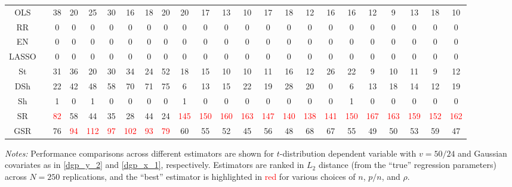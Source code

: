 \begin{table}
{\begin{tabular*}{\textwidth}{@{\extracolsep{\fill}}cc|ccccccc|ccccccc|ccccccc@{}}
\hline
OLS &  & 38 & 20 & 25 & 30 & 16 & 18 & 20 & 20 & 17 & 13 & 10 & 17 & 18 & 12 & 16 & 16 & 12 & 9 & 13 & 18 & 10 \\
RR &  & 0 & 0 & 0 & 0 & 0 & 0 & 0 & 0 & 0 & 0 & 0 & 0 & 0 & 0 & 0 & 0 & 0 & 0 & 0 & 0 & 0 \\
EN &  & 0 & 0 & 0 & 0 & 0 & 0 & 0 & 0 & 0 & 0 & 0 & 0 & 0 & 0 & 0 & 0 & 0 & 0 & 0 & 0 & 0 \\
LASSO &  & 0 & 0 & 0 & 0 & 0 & 0 & 0 & 0 & 0 & 0 & 0 & 0 & 0 & 0 & 0 & 0 & 0 & 0 & 0 & 0 & 0 \\
St &  & 31 & 36 & 20 & 30 & 34 & 24 & 52 & 18 & 15 & 10 & 10 & 11 & 16 & 12 & 26 & 22 & 9 & 10 & 11 & 9 & 12 \\
DSh &  & 22 & 42 & 48 & 58 & 70 & 71 & 75 & 6 & 13 & 15 & 22 & 19 & 28 & 20 & 0 & 6 & 13 & 18 & 14 & 12 & 19 \\
Sh &  & 1 & 0 & 1 & 0 & 0 & 0 & 0 & 1 & 0 & 0 & 0 & 0 & 0 & 0 & 0 & 1 & 0 & 0 & 0 & 0 & 0 \\
SR &  & \textcolor{red}{82} & 58 & 44 & 35 & 28 & 44 & 24 & \textcolor{red}{145} & \textcolor{red}{150} & \textcolor{red}{160} & \textcolor{red}{163} & \textcolor{red}{147} & \textcolor{red}{140} & \textcolor{red}{138} & \textcolor{red}{141} & \textcolor{red}{150} & \textcolor{red}{167} & \textcolor{red}{163} & \textcolor{red}{159} & \textcolor{red}{152} & \textcolor{red}{162} \\
GSR &  & 76 & \textcolor{red}{94} & \textcolor{red}{112} & \textcolor{red}{97} & \textcolor{red}{102} & \textcolor{red}{93} & \textcolor{red}{79} & 60 & 55 & 52 & 45 & 56 & 48 & 68 & 67 & 55 & 49 & 50 & 53 & 59 & 47 \\
\hline
\end{tabular*}%
}
\begin{tablenotes}[flushleft]
\footnotesize
\item \emph{Notes:} Performance comparisons across different estimators are shown for $t$-distribution dependent variable with $v=50/24$ and Gaussian covariates as in \eqref{dgp_y_2} and \eqref{dgp_x_1}, respectively. Estimators are ranked in $L_2$ distance (from the ``true'' regression parameters) across $N = 250$ replications, and the ``best'' estimator is highlighted in \textcolor{red}{red} for various choices of $n$, $p/n$, and $\rho$.
\end{tablenotes}
\end{table}
